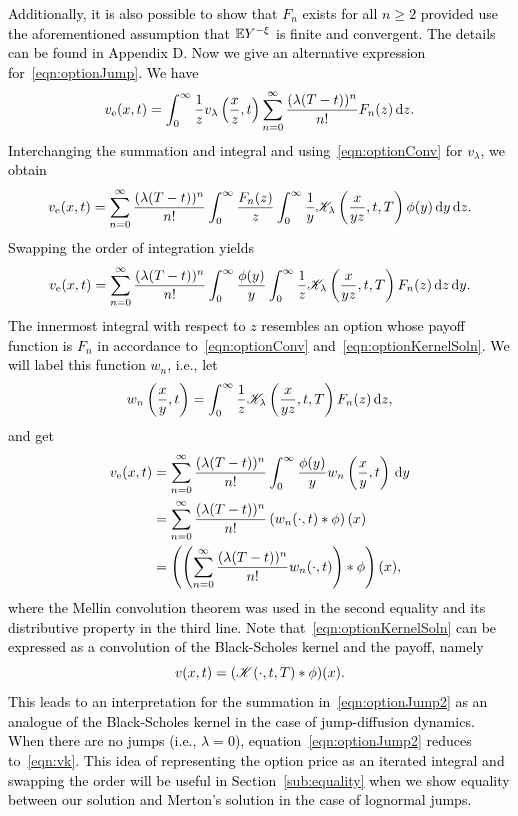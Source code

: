 \textcolor{black}{Additionally, it is also possible to show that $F_n$ exists for all $n \geq 2$ provided use the aforementioned assumption that $\mathbb E{Y^{-\xi}}$ is finite and convergent. The details can be found in Appendix D.}
\textcolor{black}{
Now we give an alternative expression for~\eqref{eqn:optionJump}. We have
	$$
		v_\text{e}(x,t) = \int_0^\infty \frac{1}{z} v_\lambda\left( \frac{x}{z},t \right)\displaystyle\sum\limits_{n=0}^\infty \frac{(\lambda(T-t))^n}{n!}F_n(z) \, \mathrm d z.
	$$
Interchanging the summation and integral and using~\eqref{eqn:optionConv} for $v_\lambda$, we obtain
	$$
		v_\text{e}(x,t) = \displaystyle\sum\limits_{n=0}^\infty\frac{(\lambda(T-t))^n}{n!}\int_0^\infty \frac{F_n(z)}{z}\int_0^\infty \frac{1}{y} \mathscr K_\lambda\left( \frac{x}{yz}, t, T \right) \phi(y) \, \mathrm d y \, \mathrm d z.
	$$
Swapping the order of integration yields
	$$
		v_\text{e}(x,t) = \displaystyle\sum\limits_{n=0}^\infty\frac{(\lambda(T-t))^n}{n!}\int_0^\infty \frac{\phi(y)}{y}\int_0^\infty \frac{1}{z} \mathscr K_\lambda\left( \frac{x}{yz}, t, T \right)F_n(z) \, \mathrm d z \, \mathrm d y.
	$$
The innermost integral with respect to $z$ resembles an option whose payoff function is $F_n$ in accordance to~\eqref{eqn:optionConv} and~\eqref{eqn:optionKernelSoln}. We will label this function $w_n$, i.e., let
	$$
		w_n\left(\frac{x}{y},t\right) = \int_0^\infty \frac{1}{z} \mathscr K_\lambda\left( \frac{x}{yz},t,T \right) F_n(z) \, \mathrm d z,
	$$ and get
	\begin{equation}
	\label{eqn:optionJump2}
	\begin{split}
		v_\text{e}(x,t) &= \displaystyle\sum\limits_{n=0}^\infty\frac{(\lambda(T-t))^n}{n!}\int_0^\infty \frac{\phi(y)}{y}w_n\left( \frac{x}{y}, t \right) \, \mathrm d y \\
		&= \displaystyle\sum\limits_{n=0}^\infty\frac{(\lambda(T-t))^n}{n!}\left( w_n(\cdot, t) \ast \phi \right)(x) \\
		&= \left( \left( \displaystyle\sum\limits_{n=0}^\infty\frac{(\lambda(T-t))^n}{n!}w_n(\cdot,t)\right)   \ast \phi \right)(x),
	\end{split}
	\end{equation}
where the Mellin convolution theorem was used in the second equality and its distributive property in the third line. Note that~\eqref{eqn:optionKernelSoln} can be expressed as a convolution of the Black-Scholes kernel and the payoff, namely
	\begin{equation}
		\label{eqn:vk}
		v(x,t) = (\mathscr K(\cdot,t,T) \ast \phi)(x).
	\end{equation}
	This leads to an interpretation for the summation in~\eqref{eqn:optionJump2} as an analogue of the Black-Scholes kernel in the case of jump-diffusion dynamics. When there are no jumps (i.e., $\lambda = 0$), equation~\eqref{eqn:optionJump2} reduces to~\eqref{eqn:vk}. This idea of representing the option price as an iterated integral and swapping the order will be useful in Section~\ref{sub:equality} when we show equality between our solution and Merton's solution in the case of lognormal jumps.
}

